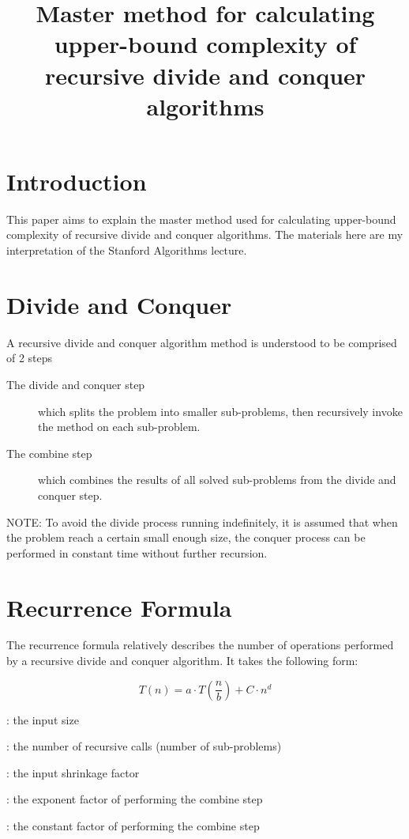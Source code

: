 \documentclass{article}
\title{Master method for calculating upper-bound complexity of recursive divide and conquer algorithms}
\date{}
\begin{document}
\maketitle

\section{Introduction}

This paper aims to explain the master method used for calculating upper-bound complexity of recursive divide and conquer algorithms. The materials here are my interpretation of the Stanford Algorithms lecture.

\section{Divide and Conquer}

A recursive divide and conquer algorithm method is understood to be comprised of 2 steps

\begin{description}
    \item[The divide and conquer step] which splits the problem into smaller sub-problems, then recursively invoke the method on each sub-problem.
    \item[The combine step] which combines the results of all solved sub-problems from the divide and conquer step.
\end{description}

\noindent\textsc{NOTE}: To avoid the divide process running indefinitely, it is assumed that when the problem reach a certain small enough size, the conquer process can be performed in constant time without further recursion.

\section{Recurrence Formula} \label{Recurrence Formula}

The recurrence formula relatively describes the number of operations performed by a recursive divide and conquer algorithm. It takes the following form:

\bigskip

\begin{equation*}
T(n) = a \cdot T(\frac{n}{b}) + C \cdot n^d
\end{equation*}

\begin{description}[labelindent=0.5cm, noitemsep, leftmargin=!,labelwidth=\widthof{\bfseries $C$}]
    \item[$n$] : the input size
    \item[$a$] : the number of recursive calls (number of sub-problems)
    \item[$b$] : the input shrinkage factor
    \item[$d$] : the exponent factor of performing the combine step
    \item[$C$] : the constant factor of performing the combine step
\end{description}
\end{document}
